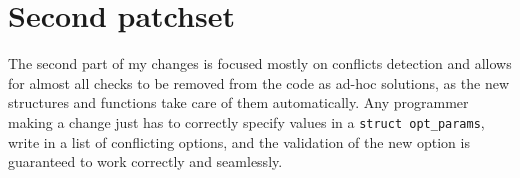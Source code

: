 \section{Second patchset}\label{chap:refactoring:second}
The second part of my changes is focused mostly on conflicts detection and allows for almost all checks to be removed from the code as ad-hoc solutions, as the new structures and functions take care of them automatically. Any programmer making a change just has to correctly specify values in a {\tt struct opt\_params}, write in a list of conflicting options, and the validation of the new option is guaranteed to work correctly and seamlessly.

